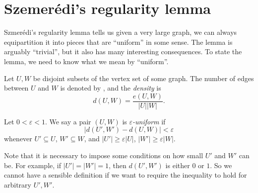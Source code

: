 \documentclass[a4paper]{article}
\begin{document}
%
%
%

\section{\texorpdfstring{Szemer\'edi's}{Szemeredi's} regularity lemma}
Szmer\'edi's regularity lemma tells us given a very large graph, we can always equipartition it into pieces that are ``uniform'' in some sense. The lemma is arguably ``trivial'', but it also has many interesting consequences. To state the lemma, we need to know what we mean by ``uniform''.


\begin{defi}[Density]
  Let $U, W$ be disjoint subsets of the vertex set of some graph. The number of edges between $U$ and $W$ is denoted by , and the \emph{density} is
  \[
    d(U, W) = \frac{e(U, W)}{|U| |W|}.
  \]
\end{defi}
\begin{defi}
  Let $0 < \varepsilon < 1$. We say a pair $(U, W)$ is \emph{$\varepsilon$-uniform} if
  \[
    |d(U', W') - d(U, W)| < \varepsilon
  \]
  whenever $U' \subseteq U$, $W' \subseteq W$, and $|U'| \geq \varepsilon |U|$, $|W'| \geq \varepsilon |W|$.
\end{defi}

Note that it is necessary to impose some conditions on how small $U'$ and $W'$ can be. For example, if $|U'| = |W'| = 1$, then $d(U', W')$ is either $0$ or $1$. So we cannot have a sensible definition if we want to require the inequality to hold for arbitrary $U', W'$.
\end{document}
